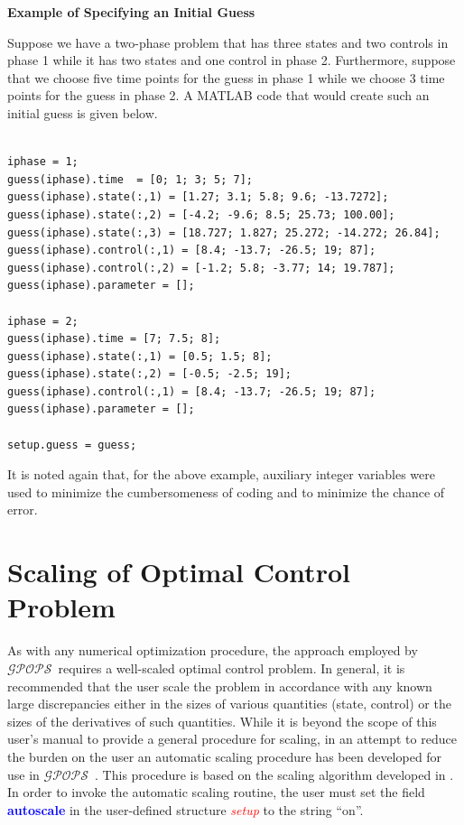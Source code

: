\documentclass[10pt,final]{report}
\newcommand{\gpops}{$\mathcal{GPOPS}$~}
\newcounter{example}[chapter]
\newenvironment{shadedframe}{%
  \def\FrameCommand{\fcolorbox{black}{shadecolor}}%
  \MakeFramed {\FrameRestore}}
{\endMakeFramed}
\newcommand{\bfblue}[1]{\textcolor{blue}{\bf #1}}
\newcommand{\slred}[1]{\textcolor{red}{\sl #1}}
\begin{document}
\begin{shadedframe}

{\noindent}{\bf Example of Specifying an Initial Guess}

\vspace{12pt}
Suppose we have a two-phase problem that has three states and two controls in
phase 1 while it has two states and one control in phase 2.  Furthermore,
suppose that we choose five time points for the guess in phase 1 while we
choose 3 time points for the guess in phase 2.  A MATLAB code that would
create such an initial guess is given below.
\begin{verbatim}

iphase = 1;
guess(iphase).time  = [0; 1; 3; 5; 7];
guess(iphase).state(:,1) = [1.27; 3.1; 5.8; 9.6; -13.7272];
guess(iphase).state(:,2) = [-4.2; -9.6; 8.5; 25.73; 100.00];
guess(iphase).state(:,3) = [18.727; 1.827; 25.272; -14.272; 26.84];
guess(iphase).control(:,1) = [8.4; -13.7; -26.5; 19; 87];
guess(iphase).control(:,2) = [-1.2; 5.8; -3.77; 14; 19.787];
guess(iphase).parameter = [];

iphase = 2;
guess(iphase).time = [7; 7.5; 8];
guess(iphase).state(:,1) = [0.5; 1.5; 8];
guess(iphase).state(:,2) = [-0.5; -2.5; 19];
guess(iphase).control(:,1) = [8.4; -13.7; -26.5; 19; 87];
guess(iphase).parameter = [];

setup.guess = guess;

\end{verbatim}
\end{shadedframe}
It is noted again that, for the above example, auxiliary integer
variables were used to minimize the cumbersomeness of coding and to
minimize the chance of error.

\section{Scaling of Optimal Control Problem\label{sect:_scaling}}

As with any numerical optimization procedure, the approach employed by
\gpops requires a well-scaled optimal control problem.  In general, it is
recommended that the user scale the problem in accordance with any known large
discrepancies either in the sizes of various quantities (\ie state, control)
or the sizes of the derivatives of such quantities.  While it is beyond the
scope of this user's manual to provide a general procedure for scaling, in an
attempt to reduce the burden on the user an automatic scaling procedure has
been developed for use in \gpops.  This procedure is based on the scaling
algorithm developed in \cite{Betts1}.  In order to invoke the automatic
scaling routine, the user must set the field \bfblue{autoscale} in the
user-defined structure \slred{setup} to the string ``on''.
\end{document}
